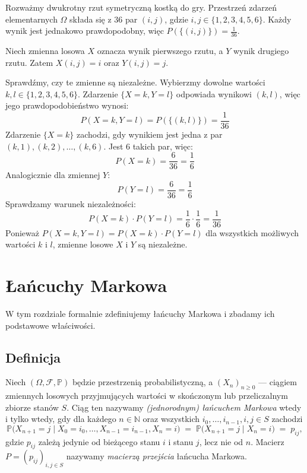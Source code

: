 \documentclass[final,a4paper,openany,12pt]{mwbk}
\begin{document}
\begin{Prz}
    Rozważmy dwukrotny rzut symetryczną kostką do gry. Przestrzeń zdarzeń elementarnych $\Omega$ składa się z 36 par $(i, j)$, gdzie $i, j \in \{1, 2, 3, 4, 5, 6\}$. Każdy wynik jest jednakowo prawdopodobny, więc $P(\{(i,j)\}) = \frac{1}{36}$.

Niech zmienna losowa $X$ oznacza wynik pierwszego rzutu, a $Y$ wynik drugiego rzutu. Zatem $X(i,j) = i$ oraz $Y(i,j) = j$.

Sprawdźmy, czy te zmienne są niezależne. Wybierzmy dowolne wartości $k, l \in \{1, 2, 3, 4, 5, 6\}$.
Zdarzenie $\{X=k, Y=l\}$ odpowiada wynikowi $(k,l)$, więc jego prawdopodobieństwo wynosi:
$$
P(X=k, Y=l) = P(\{(k,l)\}) = \frac{1}{36}
$$
Zdarzenie $\{X=k\}$ zachodzi, gdy wynikiem jest jedna z par $(k,1), (k,2), \dots, (k,6)$. Jest 6 takich par, więc:
$$
P(X=k) = \frac{6}{36} = \frac{1}{6}
$$
Analogicznie dla zmiennej $Y$:
$$
P(Y=l) = \frac{6}{36} = \frac{1}{6}
$$
Sprawdzamy warunek niezależności:
$$
P(X=k) \cdot P(Y=l) = \frac{1}{6} \cdot \frac{1}{6} = \frac{1}{36}
$$
Ponieważ $P(X=k, Y=l) = P(X=k) \cdot P(Y=l)$ dla wszystkich możliwych wartości $k$ i $l$, zmienne losowe $X$ i $Y$ są niezależne.
\end{Prz}

\chapter{Łańcuchy Markowa}

W tym rozdziale formalnie zdefiniujemy łańcuchy Markowa i zbadamy ich podstawowe właściwości.

\section{Definicja}

\begin{Def}
Niech $(\Omega,\mathcal F,\mathbb P)$ będzie przestrzenią probabilistyczną, a 
$(X_n)_{n\ge 0}$ — ciągiem zmiennych losowych przyjmujących wartości w skończonym
lub przeliczalnym zbiorze stanów $S$.  
Ciąg ten nazywamy \emph{(jednorodnym) łańcuchem Markowa} wtedy i tylko wtedy, gdy
dla każdego $n\in\mathbb N$ oraz wszystkich $i_0,\ldots,i_{n-1},i,j\in S$ zachodzi
\[
  \mathbb P\!\bigl(X_{n+1}=j \;\big|\;
      X_0=i_0,\ldots,X_{n-1}=i_{n-1},X_n=i\bigr)
    \;=\;
  \mathbb P\!\bigl(X_{n+1}=j \mid X_n=i\bigr)
    \;=\; p_{ij},
\]
gdzie $p_{ij}$ zależą jedynie od bieżącego stanu $i$ i stanu $j$, lecz nie od $n$.
Macierz $P=(p_{ij})_{i,j\in S}$ nazywamy \emph{macierzą przejścia} łańcucha Markowa.
\end{Def}
\end{document}
